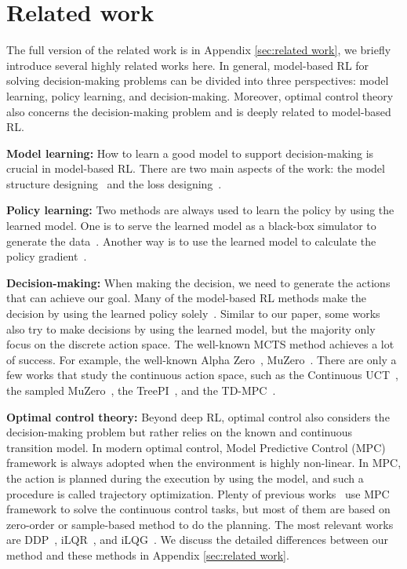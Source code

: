 \documentclass{article}
\newcommand{\yue}[1]{ {#1}}
\begin{document}
\section{Related work}

The full version of the related work is in Appendix \ref{sec:related work}, we briefly introduce several highly related works here. In general, model-based RL for solving decision-making problems can be divided into three perspectives: model learning, policy learning, and decision-making. Moreover, optimal control theory also concerns the decision-making problem and is deeply related to model-based RL.

\textbf{Model learning:} How to learn a good model to support decision-making is crucial in model-based RL. There are two main aspects of the work: the model structure designing~ and the loss designing~. 

\textbf{Policy learning:} 
Two methods are always used to learn the policy by using the learned model. One is to serve the learned model as a black-box simulator to generate the data~. Another way is to use the learned model to calculate the policy gradient~.

\textbf{Decision-making:}
When making the decision, we need to generate the actions that can achieve our goal. Many of the model-based RL methods make the decision by using the learned policy solely~. 
Similar to our paper, some works also try to make decisions by using the learned model, but the majority   only focus on the discrete action space. The well-known MCTS method achieves a lot of success. For example, the well-known Alpha Zero~, MuZero~.
There are only a few works that study the continuous action space, such as the Continuous UCT~, the sampled MuZero~, \yue{the TreePI~,} and the TD-MPC~.

\textbf{Optimal control theory:}
Beyond deep RL, optimal control  also considers the decision-making problem but rather relies on the known and continuous transition model. 
In modern optimal control, Model Predictive Control (MPC)~ framework is always adopted when the environment is highly non-linear. In MPC, the action is planned during the execution by using the model, and such a procedure is called trajectory optimization. \yue{Plenty of previous works~ use MPC framework to solve  the continuous control tasks, but most of them are based on zero-order or sample-based method to do the planning.} 
 \yue{The most relevant works are DDP~, iLQR~, and  iLQG~. We discuss the detailed differences between our method and these methods in Appendix \ref{sec:related work}.}
 
\end{document}
